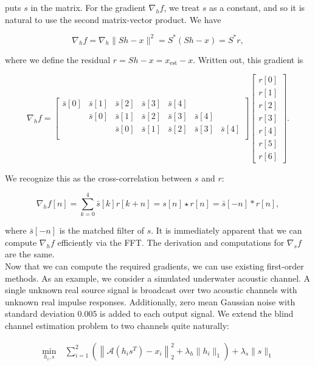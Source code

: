 \documentclass[journal]{IEEEtran}
\begin{document}
\noindent puts $s$ in the matrix.  For the gradient $\nabla_hf$, we treat $s$ as a constant, and so it is natural to use the second matrix-vector product.  We have

\[ \nabla_hf = \nabla_h\|Sh-x\|^2 = S^\ast(Sh-x) = S^\ast r, \] 

\noindent where we define the residual $r=Sh-x = x_\text{est}-x$.  Written out, this gradient is

\[ \nabla_h f = \begin{bmatrix} \bar{s}[0]&\bar{s}[1]&\bar{s}[2]&\bar{s}[3]&\bar{s}[4]\\&\bar{s}[0]&\bar{s}[1]&\bar{s}[2]&\bar{s}[3]&\bar{s}[4]\\&&\bar{s}[0]&\bar{s}[1]&\bar{s}[2]&\bar{s}[3]&\bar{s}[4]\\\end{bmatrix}\begin{bmatrix}r[0]\\r[1]\\r[2]\\r[3]\\r[4]\\r[5]\\r[6]\end{bmatrix}. \] 

\noindent We recognize this as the cross-correlation between $s$ and $r$:

\[ \nabla_h f[n] = \sum_{k=0}^4 \bar{s}[k]r[k+n] = s[n]\star r[n] = \bar{s}[-n]\ast r[n], \]

\noindent where $\bar{s}[-n]$ is the matched filter of $s$.  It is immediately apparent that we can compute $\nabla_hf$ efficiently via the FFT.  The derivation and computations for $\nabla_sf$ are the same.\\

Now that we can compute the required gradients, we can use existing first-order methods.  As an example, we consider a simulated underwater acoustic channel.  A single unknown real source signal is broadcast over two acoustic channels with unknown real impulse responses.  Additionally, zero mean Gaussian noise with standard deviation $0.005$ is added to each output signal.  We extend the blind channel estimation problem to two channels quite naturally:

\begin{align*}
   \min_{h_i,s} ~&\sum_{i=1}^2\left(\left\|\mathcal{A}(h_is^T) - x_i\right\|_2^2 + \lambda_{h}\|h_i\|_1\right) + \lambda_s\|s\|_1
\end{align*}
\end{document}

